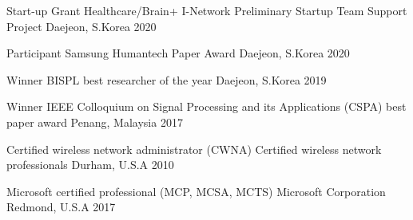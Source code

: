 



\begin{cvhonors}

  \cvhonor
    {Start-up Grant} %
    {Healthcare/Brain+ I-Network Preliminary Startup Team Support Project} %
    {Daejeon, S.Korea} %
    {2020} %

  \cvhonor
    {Participant} %
    {Samsung Humantech Paper Award} %
    {Daejeon, S.Korea} %
    {2020} %
    
  \cvhonor
    {Winner} %
    {BISPL best researcher of the year} %
    {Daejeon, S.Korea} %
    {2019} %

  \cvhonor
    {Winner} %
    {IEEE Colloquium on Signal Processing and its Applications (CSPA) best paper award} %
    {Penang, Malaysia} %
    {2017} %

\end{cvhonors}



\begin{cvhonors}

  \cvhonor
    {Certified wireless network administrator (CWNA)} %
    {Certified wireless network professionals} %
    {Durham, U.S.A} %
    {2010} %

  \cvhonor
    {Microsoft certified professional (MCP, MCSA, MCTS)} %
    {Microsoft Corporation} %
    {Redmond, U.S.A} %
    {2017} %

\end{cvhonors}
